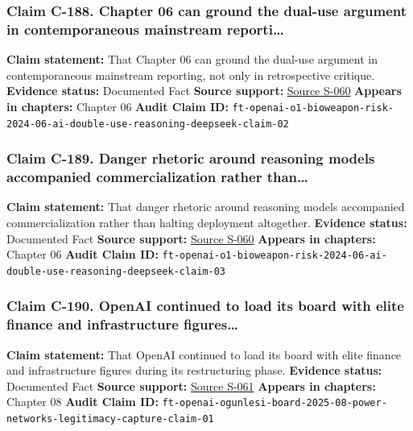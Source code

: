 \documentclass[
  american,
  11pt,
  letterpaper,
]{article}
\begin{document}
\subsubsection{Claim C-188. Chapter 06 can ground the dual-use argument
in contemporaneous mainstream
reporti\ldots{}}\label{claim-c-188-chapter-06-can-ground-the-dual-use-argument-in-contemporaneous-mainstream-reporti}

\textbf{Claim statement:} That Chapter 06 can ground the dual-use
argument in contemporaneous mainstream reporting, not only in
retrospective critique. \textbf{Evidence status:} Documented Fact
\textbf{Source support:}
\hyperref[source-s-060-openai-acknowledges-new-models-increase-risk-of-misuse-to-create-bioweapons]{Source
S-060} \textbf{Appears in chapters:} Chapter 06 \textbf{Audit Claim ID:}
\texttt{ft-openai-o1-bioweapon-risk-2024-06-ai-double-use-reasoning-deepseek-claim-02}

\subsubsection{Claim C-189. Danger rhetoric around reasoning models
accompanied commercialization rather
than\ldots{}}\label{claim-c-189-danger-rhetoric-around-reasoning-models-accompanied-commercialization-rather-than}

\textbf{Claim statement:} That danger rhetoric around reasoning models
accompanied commercialization rather than halting deployment altogether.
\textbf{Evidence status:} Documented Fact \textbf{Source support:}
\hyperref[source-s-060-openai-acknowledges-new-models-increase-risk-of-misuse-to-create-bioweapons]{Source
S-060} \textbf{Appears in chapters:} Chapter 06 \textbf{Audit Claim ID:}
\texttt{ft-openai-o1-bioweapon-risk-2024-06-ai-double-use-reasoning-deepseek-claim-03}

\subsubsection{Claim C-190. OpenAI continued to load its board with
elite finance and infrastructure
figures\ldots{}}\label{claim-c-190-openai-continued-to-load-its-board-with-elite-finance-and-infrastructure-figures}

\textbf{Claim statement:} That OpenAI continued to load its board with
elite finance and infrastructure figures during its restructuring phase.
\textbf{Evidence status:} Documented Fact \textbf{Source support:}
\hyperref[source-s-061-openai-appoints-one-of-wall-street-s-most-powerful-dealmakers-to-its-board]{Source
S-061} \textbf{Appears in chapters:} Chapter 08 \textbf{Audit Claim ID:}
\texttt{ft-openai-ogunlesi-board-2025-08-power-networks-legitimacy-capture-claim-01}
\end{document}

